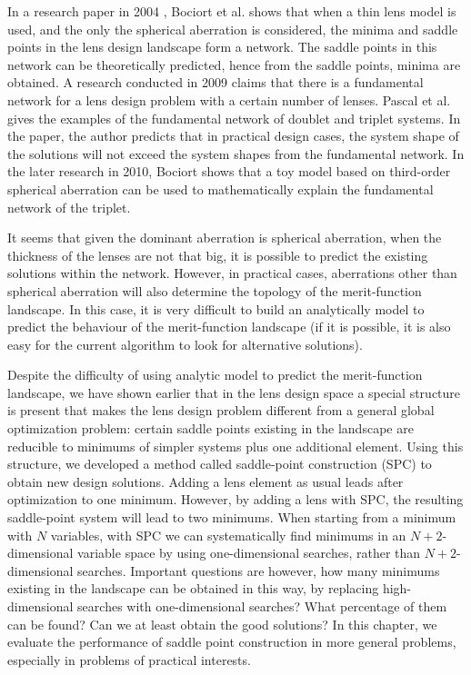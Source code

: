 In a research paper in 2004 \cite{BociortThinLens2004}, Bociort et al. shows that when a thin lens model is used, and the only the spherical aberration is considered, the minima and saddle points in the lens design landscape form a network. The saddle points in this network can be theoretically predicted, hence from the saddle points, minima are obtained. A research conducted in 2009\cite{PascalTriplet2009} claims that there is a fundamental network for a lens design problem with a certain number of lenses. Pascal et al. gives the examples of the fundamental network of doublet and triplet systems. In the paper, the author predicts that in practical design cases, the system shape of the solutions will not exceed the system shapes from the fundamental network. In the later research in 2010\cite{BociortTripletExplained2010}\cite{BociortToyModel2010}, Bociort shows that a toy model based on third-order spherical aberration can be used to mathematically explain the fundamental network of the triplet. 

It seems that given the dominant aberration is spherical aberration, when the thickness of the lenses are not that big, it is possible to predict the existing solutions within the network. However, in practical cases, aberrations other than spherical aberration will also determine the topology of the merit-function landscape. In this case, it is very difficult to build an analytically model to predict the behaviour of the merit-function landscape (if it is possible, it is also easy for the current algorithm to look for alternative solutions).

Despite the difficulty of using analytic model to predict the merit-function landscape, we have shown earlier that in the lens design space a special structure is present that makes the lens design problem different from a general global optimization problem: certain saddle points existing in the landscape are reducible to minimums of simpler systems plus one additional element. Using this structure, we developed a method called saddle-point construction (SPC) \cite{MVTurnhoutSPC15} to obtain new design solutions. Adding a lens element as usual leads after optimization to one minimum. However, by adding a lens with SPC, the resulting saddle-point system will lead to two minimums. When starting from a minimum with $N$ variables, with SPC we can systematically find minimums in an $N+2$-dimensional variable space by using one-dimensional searches, rather than $N+2$-dimensional searches. Important questions are however, how many minimums existing in the landscape can be obtained in this way, by replacing high-dimensional searches with one-dimensional searches? What percentage of them can be found? Can we at least obtain the good solutions? In this chapter, we evaluate the performance of saddle point construction in more general problems, especially in problems of practical interests. 


